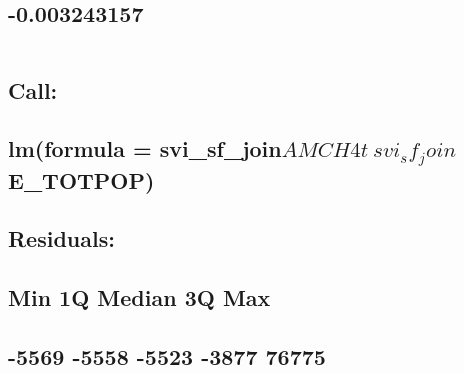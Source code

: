 \documentclass[
  12pt,
]{article}
\begin{document}
\hypertarget{section-23}{%
\subsection{-0.003243157}\label{section-23}}

\begin{verbatim}
\end{verbatim}

\hypertarget{section-24}{%
\subsection{}\label{section-24}}

\hypertarget{call-2}{%
\subsection{Call:}\label{call-2}}

\hypertarget{lmformula-svi_sf_joinamch4t-svi_sf_joine_totpop}{%
\subsection{\texorpdfstring{lm(formula =
svi\_sf\_join\(AMCH4t ~ svi_sf_join\)E\_TOTPOP)}{lm(formula = svi\_sf\_joinAMCH4t \textasciitilde{} svi\_sf\_joinE\_TOTPOP)}}\label{lmformula-svi_sf_joinamch4t-svi_sf_joine_totpop}}

\hypertarget{section-25}{%
\subsection{}\label{section-25}}

\hypertarget{residuals-2}{%
\subsection{Residuals:}\label{residuals-2}}

\hypertarget{min-1q-median-3q-max-2}{%
\subsection{Min 1Q Median 3Q Max}\label{min-1q-median-3q-max-2}}

\hypertarget{section-26}{%
\subsection{-5569 -5558 -5523 -3877 76775}\label{section-26}}

\hypertarget{section-27}{%
\subsection{}\label{section-27}}
\end{document}
